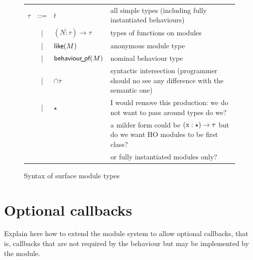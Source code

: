 \documentclass[a4paper,10pt]{article}
\begin{document}
\begin{figure}
  \begin{tabular}{r c ll}
    $\tau$ & ::= & $t$                 &\color{Gray} all simple types (including fully instantiated behaviours)\\
    & | & $\left(\overline{N:\tau}\right)\rightarrow \tau$ &\color{Gray} types of functions on modules\\
    & | & $\operatorname{\textsf{like}}(M)$                 &\color{Gray}anonymous module type\\
    & | & $\operatorname{\textsf{behaviour\!\_\!of}}(M)$                 &\color{Gray}nominal behaviour type\\
    & | & $\cap\overline{\tau}$        &\color{Gray} syntactic intersection (programmer should no see any difference with the semantic one) \\
    & | & $\star$            & \color{bordeaux} I would remove this production: we do not want to pass around types do we?\\
                                      &&&\color{bordeaux} a milder form could be $(\text{\rm x}:\star)\to\tau$ but do we want HO modules to be first class?\\        
                                      &&&\color{bordeaux} or fully instantiated modules only?
  \end{tabular}
  \caption{Syntax of surface module types}
\end{figure}
\section{Optional callbacks}

Explain here how to extend the module system to allow optional callbacks, that is, callbacks that are not required by the behaviour but may be implemented by the module.

\printbibliography
\appendix

\end{document}

